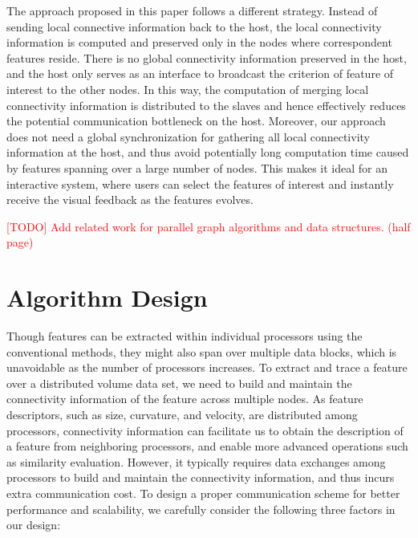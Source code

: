 \documentclass[10pt, conference, compsocconf]{IEEEtran}
\begin{document}
The approach proposed in this paper follows a different strategy. Instead of sending local connective information back to the host, the local connectivity information is computed and preserved only in the nodes where correspondent features reside. There is no global connectivity information preserved in the host, and the host only serves as an interface to broadcast the criterion of feature of interest to the other nodes. In this way, the computation of merging local connectivity information is distributed to the slaves and hence effectively reduces the potential communication bottleneck on the host.
Moreover, our approach does not need a global synchronization for gathering all local connectivity information at the host, and thus avoid potentially long computation time caused by features spanning over a large number of nodes. 
This makes it ideal for an interactive system, where users can select the features of interest and instantly receive the visual feedback as the features evolves.

\textcolor{red}{[TODO] Add related work for parallel graph algorithms and data structures. (half page)}

\section{Algorithm Design}
Though features can be extracted within individual processors using the conventional methods, they might also span over multiple data blocks, which is unavoidable as the number of processors increases. To extract and trace a feature over a distributed volume data set, we need to build and maintain the connectivity information of the feature across multiple nodes. As feature descriptors, such as size, curvature, and velocity, are distributed among processors, connectivity information can facilitate us to obtain the description of a feature from neighboring processors, and enable more advanced operations such as similarity evaluation.
However, it typically requires data exchanges among processors to build and maintain the connectivity information, and thus incurs extra communication cost. To design a proper communication scheme for better performance and scalability, we carefully consider the following three factors in our design:
\end{document}
